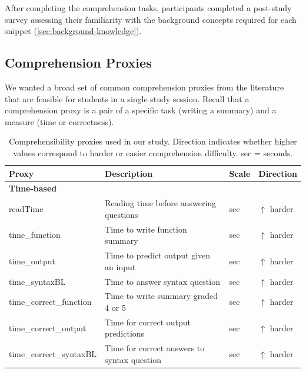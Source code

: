 After completing the comprehension tasks, participants completed a post-study survey assessing their familiarity with the background concepts required for each snippet (\cref{sec:background-knowledge}). 



\subsection{Comprehension Proxies}
\label{sec:proxies}

We wanted a broad set of common comprehension proxies from the literature that are feasible for students in a single study session.
Recall that a comprehension proxy is a pair of a specific task (\eg writing a summary) and a measure (\eg time or correctness).

\begin{table}[t]
\scriptsize
\centering
\caption{Comprehensibility proxies used in our study. Direction indicates whether higher values correspond to harder or easier comprehension difficulty. sec = seconds.}
\label{tab:proxies}

\begin{tabularx}{\columnwidth}{l X l l}
\toprule
\textbf{Proxy} & \textbf{Description} & \textbf{Scale} & \textbf{Direction} \\
\midrule

\multicolumn{4}{l}{\textbf{Time-based}} \\

readTime & Reading time before answering questions & sec & $\uparrow$ harder \\

time\_function & Time to write function summary & sec & $\uparrow$ harder \\

time\_output & Time to predict output given an input & sec & $\uparrow$ harder \\

time\_syntaxBL & Time to answer syntax question & sec & $\uparrow$ harder \\

time\_correct\_function & Time to write summary graded 4 or 5 & sec & $\uparrow$ harder \\

time\_correct\_output & Time for correct output predictions & sec & $\uparrow$ harder \\

time\_correct\_syntaxBL & Time for correct answers to syntax question & sec & $\uparrow$ harder \\


\end{tabularx}
\end{table}
